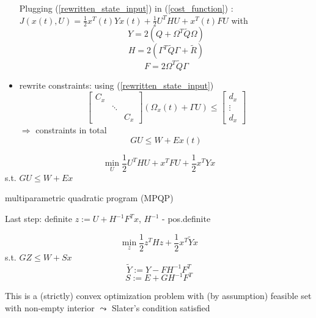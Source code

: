 \begin{itemize}
Plugging (\ref{rewritten_state_input}) in (\ref{cost_function}) : $J(x(t),U) = \frac{1}{2}x^T(t)Yx(t) + \frac{1}{2}U^THU + x^T(t)FU$
with
\begin{equation*}
Y = 2(Q + \Omega^T \tilde{Q} \Omega)
\end{equation*}
\begin{equation*}
H = 2(\Gamma^T\tilde{Q}\Gamma + \tilde{R})
\end{equation*}
\begin{equation*}
F = 2\Omega^T \tilde{Q} \Gamma
\end{equation*}

\item rewrite constraints: using (\ref{rewritten_state_input})
\begin{equation*}
\begin{bmatrix}
    C_x  & \  & \ \\
    \  &\ddots & \\
     \  & \ & C_x     
\end{bmatrix} (\Omega_x(t) + \Gamma U) \leq \begin{bmatrix}
   d_x \\
   \vdots \\
   d_x   
\end{bmatrix}
\end{equation*}
$\Rightarrow$ constraints in total
\begin{equation*}
GU \leq W + Ex(t)
\end{equation*}
\end{itemize}

\begin{equation*}
\min_U \frac{1}{2} U^THU + x^TFU + \frac{1}{2}x^TYx
\end{equation*}
s.t. $GU \leq W + Ex$

multiparametric quadratic program (MPQP)

Last step: definite $z:=U+H^{-1}F^Tx$, $H^{-1}$ - pos.definite 

\begin{equation}\label{rewritten_problem}
\min_{z} \frac{1}{2}z^THz + \frac{1}{2}x^T \tilde{Y}x
\end{equation}
s.t. $GZ \leq W + Sx$
\begin{equation*}
\tilde{Y} := Y - FH^{-1}F^T
\end{equation*}
\begin{equation*}
S := E + GH^{-1}F^T
\end{equation*}

This is a (strictly) convex optimization problem with (by assumption) feasible set with non-empty interior $\leadsto$ Slater's condition satisfied

